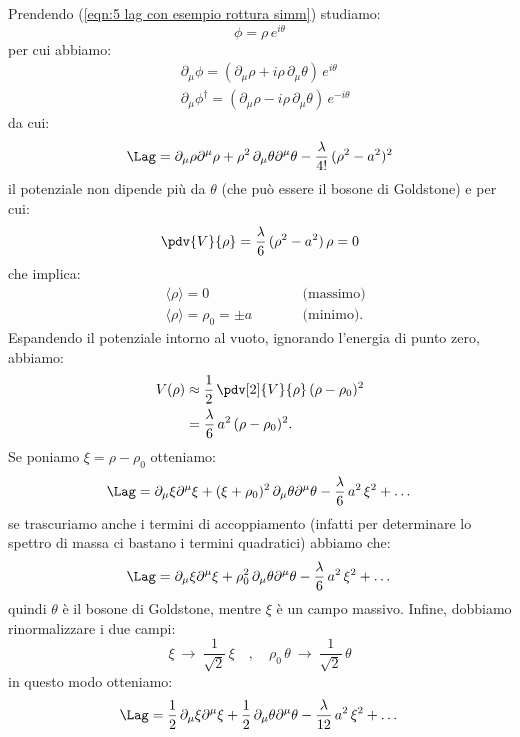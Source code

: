 Prendendo (\ref{eqn:5 lag con esempio rottura simm}) studiamo:
\begin{equation}
    \phi = \rho\, e^{i\theta}
\end{equation}
per cui abbiamo:
\begin{align}
    &\partial_\mu\phi = \left( \partial_\mu\rho + i\rho\, \partial_\mu\theta \right)\, e^{i\theta} \\
    &\partial_\mu\phi^\dagger = \left( \partial_\mu\rho - i\rho\, \partial_\mu\theta \right)\, e^{-i\theta}
\end{align}
da cui:
\begin{equation}
    \Lag = \partial_\mu\rho\partial^\mu\rho + \rho^2\, \partial_\mu\theta\partial^\mu\theta - \frac{\lambda}{4!}\, (\rho^2 - a^2)^2
\end{equation}
il potenziale non dipende più da $\theta$ (che può essere il bosone di Goldstone) e per cui:
\begin{equation}
    \pdv{V}{\rho} = \frac{\lambda}{6}\, (\rho^2 - a^2)\, \rho = 0
\end{equation}
che implica:
\begin{align}
    &\langle\rho\rangle = 0 \qquad &&\text{(massimo)} \\
    &\langle\rho\rangle = \rho_0 = \pm a \qquad &&\text{(minimo)}.
\end{align}
Espandendo il potenziale intorno al vuoto, ignorando l'energia di punto zero, abbiamo:
\begin{align}
    V(\rho) &\approx \frac{1}{2}\, \pdv[2]{V}{\rho}\, (\rho - \rho_0)^2 \\
    &= \frac{\lambda}{6}\, a^2\, (\rho - \rho_0)^2.
\end{align}
Se poniamo $\xi = \rho - \rho_0$ otteniamo:
\begin{equation}
    \Lag = \partial_\mu\xi\partial^\mu\xi + (\xi + \rho_0)^2\, \partial_\mu\theta\partial^\mu\theta - \frac{\lambda}{6}\, a^2\, \xi^2 + \dots
\end{equation}
se trascuriamo anche i termini di accoppiamento (infatti per determinare lo spettro di massa ci bastano i termini quadratici) abbiamo che:
\begin{equation}
    \Lag = \partial_\mu\xi\partial^\mu\xi + \rho_0^2\, \partial_\mu\theta\partial^\mu\theta - \frac{\lambda}{6}\, a^2\, \xi^2 + \dots
\end{equation}
quindi $\theta$ è il bosone di Goldstone, mentre $\xi$ è un campo massivo. Infine, dobbiamo rinormalizzare i due campi:
\begin{equation}
    \xi \ \longrightarrow \ \frac{1}{\sqrt{2}}\, \xi \quad , \quad \rho_0\, \theta \ \longrightarrow\ \frac{1}{\sqrt{2}}\, \theta
\end{equation}
in questo modo otteniamo:
\begin{equation}
    \Lag = \frac{1}{2}\, \partial_\mu\xi\partial^\mu\xi + \frac{1}{2}\, \partial_\mu\theta\partial^\mu\theta - \frac{\lambda}{12}\, a^2\, \xi^2 + \dots
\end{equation}


